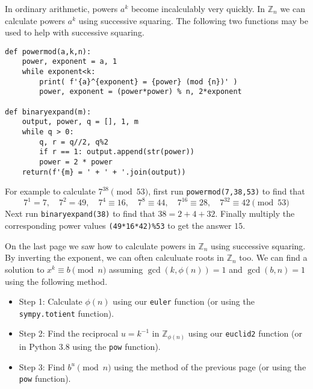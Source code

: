 \documentclass[12pt]{exam}
\newcommand{\Z}{\mathbb Z}
\begin{document}
\begin{questions}
  \question In ordinary arithmetic, powers $a^k$ become incalculably very quickly. In $\Z_n$ we can calculate powers $a^k$ using successive squaring. The following two functions may be used to help with successive squaring.
  
  \begin{lstlisting}
def powermod(a,k,n):
    power, exponent = a, 1
    while exponent<k:
        print( f'{a}^{exponent} = {power} (mod {n})' )
        power, exponent = (power*power) % n, 2*exponent

def binaryexpand(m):
    output, power, q = [], 1, m
    while q > 0:
        q, r = q//2, q%2
        if r == 1: output.append(str(power))
        power = 2 * power
    return(f'{m} = ' + ' + '.join(output))
  \end{lstlisting}
  
  For example to calculate $7^{38}\pmod{53}$, first run \texttt{powermod(7,38,53)} to find that
  \[7^1=7,\quad 7^2=49,\quad 7^4\equiv 16,\quad 7^8\equiv 44,\quad 7^{16}\equiv28,\quad 7^{32}\equiv42\pmod{53}
  \]
  Next run \texttt{binaryexpand(38)} to find that $38=2+4+32$. Finally multiply the corresponding power values \texttt{(49*16*42)\%53} to get the answer $15$.
  \newpage
  \question On the last page we saw how to calculate powers in $\Z_n$ using successive squaring. By inverting the exponent, we can often calculuate roots in $\Z_n$ too. We can find a solution to $x^k\equiv b\pmod{n}$ assuming $\gcd(k,\phi(n))=1$ and $\gcd(b,n)=1$ using the following method.
  \begin{itemize}
    \item Step 1: Calculate $\phi(n)$ using our \texttt{euler} function (or using the \texttt{sympy.totient} function).
    \item Step 2: Find the reciprocal $u=k^{-1}$ in $\Z_{\phi(n)}$ using our \texttt{euclid2} function (or in Python 3.8 using the \texttt{pow} function).
    \item Step 3: Find $b^u\pmod{n}$ using the method of the previous page (or using the \texttt{pow} function).
  \end{itemize}
  \begin{parts}

\end{parts}
\end{questions}
\end{document}
